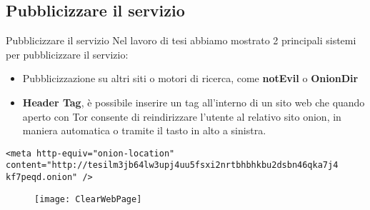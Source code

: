 \subsection{Pubblicizzare il servizio}
\begin{frame}{Pubblicizzare il servizio}
    Nel lavoro di tesi abbiamo mostrato 2 principali sistemi per pubblicizzare il servizio:
    \begin{itemize}
        \item Pubblicizzazione su altri siti o motori di ricerca, come \textbf{notEvil} o \textbf{OnionDir}
        \item \textbf{Header Tag}, è possibile inserire un tag all'interno di un sito web che quando aperto con Tor consente di reindirizzare l'utente al relativo sito onion, in maniera automatica o tramite il tasto in alto a sinistra.
    \end{itemize}
    \lstinline{<meta http-equiv="onion-location" content="http://tesilm3jb64lw3upj4uu5fsxi2nrtbhbhkbu2dsbn46qka7j4 kf7peqd.onion" />}
\end{frame}

\begin{frame}
    \begin{figure}
        \centering
        \texttt{[image: ClearWebPage]}
    \end{figure}
\end{frame}

